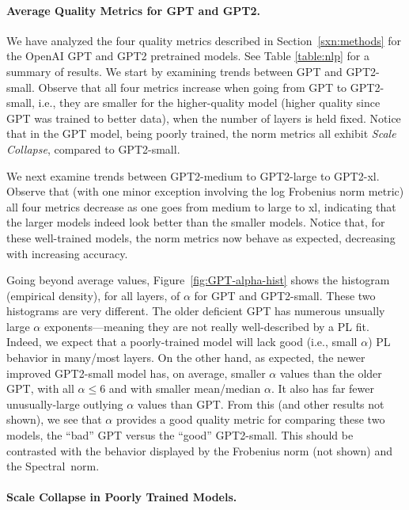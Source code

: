 \paragraph{Average Quality Metrics for GPT and GPT2.}

We have analyzed the four quality metrics described in Section~\ref{sxn:methods} for the OpenAI GPT and GPT2 pretrained models.
See Table \ref{table:nlp} for a summary of results.
We start by examining trends between GPT and GPT2-small.
Observe that all four metrics increase when going from GPT to GPT2-small, i.e., they are smaller for the higher-quality model (higher quality since GPT was trained to better data), when the number of layers is held fixed.
Notice that in the GPT model, being poorly trained, the norm metrics all exhibit \emph{Scale Collapse}, compared to GPT2-small.

We next examine trends between GPT2-medium to GPT2-large to GPT2-xl.
Observe that (with one minor exception involving the log Frobenius norm metric) all four metrics decrease as one goes from medium to large to xl, indicating that the larger models indeed look better than the smaller models.
Notice that, for these well-trained models, the norm metrics now behave as expected, decreasing with increasing accuracy.

Going beyond average values, Figure~\ref{fig:GPT-alpha-hist} shows the histogram (empirical density), for all layers, of $\alpha$ for GPT and GPT2-small.  
These two histograms are very different.
The older deficient GPT has numerous unsually large $\alpha$ exponents---meaning they are not really well-described by a PL fit.
Indeed, we expect that a poorly-trained model will lack good (i.e., small $\alpha$) PL behavior in many/most layers.
On the other hand, as expected, the newer improved GPT2-small model has, on average, smaller $\alpha$ values than the older GPT, with all $\alpha\le6$ and with smaller mean/median $\alpha$.
It also has far fewer unusually-large outlying $\alpha$ values than GPT.
From this (and other results not shown), we see that $\alpha$ provides a good quality metric for comparing these two models, the ``bad'' GPT versus the ``good'' GPT2-small.
%
This should be contrasted with the behavior displayed by the Frobenius norm (not shown) and the Spectral~norm.


\paragraph{Scale Collapse in Poorly Trained Models.}

